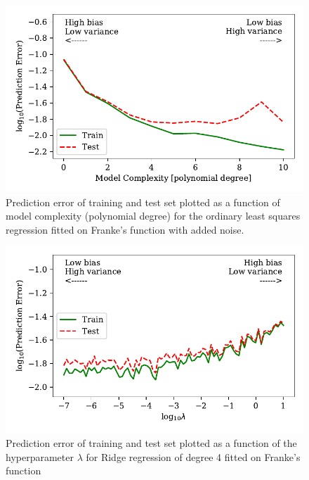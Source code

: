 \documentclass[a4paper, 10pt]{article}
\begin{document}
\begin{figure}
    \includegraphics[scale=1]{figs/biasvariancetradeoff_ols_Franke.pdf}
    \caption{Prediction error of training and test set plotted as a function of model complexity (polynomial degree) for the ordinary least squares regression fitted on Franke's function with added noise.}
    \label{fig:bias_ols_Franke}
\end{figure}

\begin{figure}
    \includegraphics{figs/biasvariancetradeoff_Ridge_Franke.pdf}
    \caption{Prediction error of training and test set plotted as a function of the hyperparameter $\lambda$ for Ridge regression of degree 4 fitted on Franke's function}
    \label{fig:bias_ridge_Franke}
\end{figure}
\end{document}
